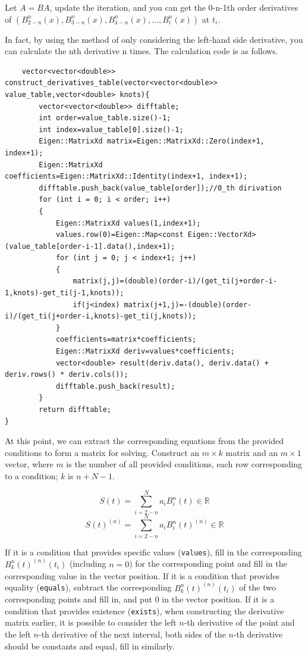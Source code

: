 \documentclass[a4paper]{article}
\begin{document}
Let $A = BA$, update the iteration, and you can get the 0-n-1th order derivatives of 
$(B^n_{2-n}(x) , B^n_{3-n}(x) , B^n_{4-n}(x) , \dots , B^n_{i}(x))$ at $t_i$.

In fact, by using the method of only considering the left-hand side derivative, you can calculate the nth derivative n times. The calculation code is as follows.

\begin{verbatim}
    vector<vector<double>> construct_derivatives_table(vector<vector<double>> value_table,vector<double> knots){
        vector<vector<double>> difftable;
        int order=value_table.size()-1;
        int index=value_table[0].size()-1;
        Eigen::MatrixXd matrix=Eigen::MatrixXd::Zero(index+1, index+1);
        Eigen::MatrixXd coefficients=Eigen::MatrixXd::Identity(index+1, index+1);     
        difftable.push_back(value_table[order]);//0_th dirivation
        for (int i = 0; i < order; i++)
        {
            Eigen::MatrixXd values(1,index+1);
            values.row(0)=Eigen::Map<const Eigen::VectorXd>(value_table[order-i-1].data(),index+1);
            for (int j = 0; j < index+1; j++)
            {
                matrix(j,j)=(double)(order-i)/(get_ti(j+order-i-1,knots)-get_ti(j-1,knots));
                if(j<index) matrix(j+1,j)=-(double)(order-i)/(get_ti(j+order-i,knots)-get_ti(j,knots));
            }
            coefficients=matrix*coefficients;
            Eigen::MatrixXd deriv=values*coefficients;
            vector<double> result(deriv.data(), deriv.data() + deriv.rows() * deriv.cols());
            difftable.push_back(result);
        }
        return difftable;
}
\end{verbatim}
At this point, we can extract the corresponding equations from the provided conditions to form a matrix for solving. Construct an $m \times k$ matrix and an $m \times 1$ vector, where $m$ is the number of all provided conditions, each row corresponding to a condition; $k$ is $n + N - 1$.

\[
S(t) = \sum_{i=2-n}^{N} a_i B_i^n(t) \in \mathbb{R}
\]
\[
S(t)^{(n)} = \sum_{i=2-n}^{N} a_i B_i^n(t)^{(n)} \in \mathbb{R}
\]

If it is a condition that provides specific values (\texttt{values}), fill in the corresponding $B_k^n(t)^{(n)}(t_i)$ (including $n=0$) for the corresponding point and fill in the corresponding value in the vector position. If it is a condition that provides equality (\texttt{equals}), subtract the corresponding $B_k^n(t)^{(n)}(t_i)$ of the two corresponding points and fill in, and put 0 in the vector position. If it is a condition that provides existence (\texttt{exists}), when constructing the derivative matrix earlier, it is possible to consider the left $n$-th derivative of the point and the left $n$-th derivative of the next interval, both sides of the $n$-th derivative should be constants and equal, fill in similarly.
\end{document}
